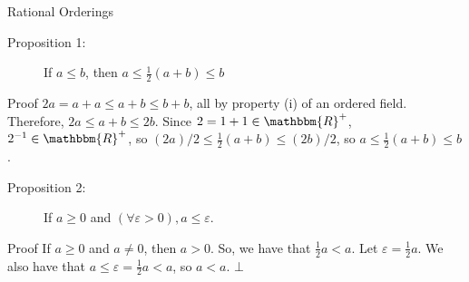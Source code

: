 \documentclass[10pt]{extarticle}
\newcommand{\R}{\mathbbm{R}}
\begin{document}
  \begin{problem}{Rational Orderings}
    \begin{description}
      \item[Proposition 1:] If $a\leq b$, then $a\leq \frac{1}{2}(a+b) \leq b$
    \end{description}
    \begin{problem}{Proof}
      $2a = a+a \leq a+b \leq b+b$, all by property (i) of an ordered field.\\

      Therefore, $2a \leq a+b \leq 2b$. Since $2 = 1+1 \in \R^+$, $2^{-1}\in \R^+$, so $(2a)/2 \leq \frac{1}{2}(a+b) \leq (2b)/2$, so $a\leq \frac{1}{2}(a+b) \leq b$.
    \end{problem}
    \begin{description}
      \item[Proposition 2:] If $a\geq 0$ and $(\forall \varepsilon > 0), a\leq \varepsilon$.
    \end{description}
    \begin{problem}{Proof}
      If $a\geq 0$ and $a\neq 0$, then $a > 0$. So, we have that $\frac{1}{2}a < a$. Let $\varepsilon = \frac{1}{2}a$. We also have that $a \leq \varepsilon = \frac{1}{2}a < a$, so $a<a$. $\bot$
    \end{problem}
  \end{problem}
\end{document}
